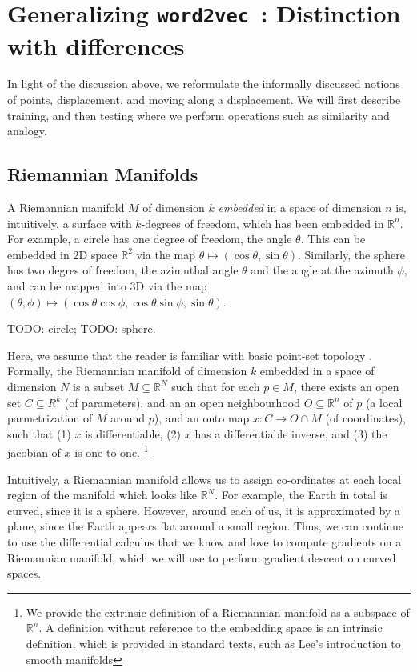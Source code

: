 \documentclass[11pt]{book}
\newcommand{\wtov}{\texttt{word2vec }}
\newcommand{\R}{\ensuremath{\mathbb R}}
\begin{document}
\section{Generalizing \wtov: Distinction with differences}

In light of the discussion above, we reformulate the informally discussed notions of
points, displacement, and moving along a displacement. We will first describe training, and then
testing where we perform operations such as similarity and analogy.

\subsection{Riemannian Manifolds}
A Riemannian manifold $M$ of dimension $k$ \emph{embedded} in a space of
dimension $n$ is, intuitively, a surface with $k$-degrees of freedom, which has
been embedded in $\R^n$.  For example, a circle has one degree of freedom, the angle $\theta$.
This can be embedded in 2D space $\mathbb R^2$ via the map $\theta \mapsto (\cos \theta, \sin \theta)$.
Similarly, the sphere has two degres of freedom, the azimuthal angle $\theta$ and the angle
at the azimuth $\phi$, and can be mapped into 3D via the map
$(\theta, \phi) \mapsto (\cos \theta \cos \phi, \cos \theta \sin \phi, \sin \theta)$.

TODO: circle; TODO: sphere.

Here, we assume that the reader is familiar with basic point-set topology \cite{munkres2014topology}.
Formally, the Riemannian manifold of dimension $k$ embedded in a space of dimension $N$
is a subset $M \subseteq \R^N$ such that for each $p \in M$,
there exists an open set $C \subseteq R^k$ (of parameters), and an
an open neighbourhood $O \subseteq \mathbb R^n$ of $p$ (a local parmetrization of $M$ around $p$),
and an onto map $x: C \rightarrow O \cap M$ (of coordinates), such that (1) $x$ is differentiable,
(2) $x$ has a differentiable inverse, and (3) the jacobian of $x$ is one-to-one.
\footnote{We provide the extrinsic definition of a Riemannian manifold as a
subspace of $\mathbb R^n$.  A definition without reference to the embedding
space is an intrinsic definition, which is provided in standard texts, such as
Lee's introduction to smooth manifolds}

Intuitively, a Riemannian manifold allows us to assign co-ordinates at each
local region of the manifold which looks like $\R^N$. For example, the Earth in
total is curved, since it is a sphere. However, around each of us, it is
approximated by a plane, since the Earth appears flat around a small region.
Thus, we can continue to use the differential calculus that we know and love to
compute gradients on a Riemannian manifold, which we will use to perform gradient
descent on curved spaces.
\end{document}
